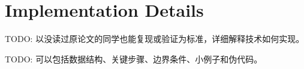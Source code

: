 \section{Implementation Details}

TODO: 以没读过原论文的同学也能复现或验证为标准，详细解释技术如何实现。

TODO: 可以包括数据结构、关键步骤、边界条件、小例子和伪代码。
